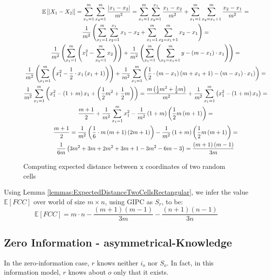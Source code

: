 \documentclass[letterpaper, 10 pt, conference]{ieeeconf}  %
\newcommand\rob{\ensuremath{r}\xspace}
\newcommand\opp{\ensuremath{o}\xspace}
\newcommand{\fcc}{\ensuremath{FCC}\xspace}
\DeclarePairedDelimiter\abs{\lvert}{\rvert}%
\begin{document}
\begin{figure*}[thb]
      \centering
      \begin{multline*}
\mathbb{E}\left[\abs*{X_1-X_2}\right] =
\sum_{x_1=1}^{m}\sum_{x_2=1}^{m}{\frac{\abs*{x_1-x_2}}{m^2}} = \sum_{x_1=1}^{m}\sum_{x_2=1}^{x_1}{\frac{x_1-x_2}{m^2}}+\sum_{x_1=1}^{m}\sum_{x_2=x_1+1}^{m}{\frac{x_2-x_1}{m^2}}=\\
\frac{1}{m^2}\left(\sum_{x_1=1}^{m}\sum_{x_2=1}^{x_1}{x_1-x_2}+\sum_{x_1=1}^{m}\sum_{x_2=x_1+1}^{m}{x_2-x_1}\right)=\\
\frac{1}{m^2}\left(\sum_{x_1=1}^{m}{\left(x_1^2-\sum_{x_2=1}^{m}{x_2}\right)}\right)+
\frac{1}{m^2}\left(\sum_{x_1=1}^{m}\left(\sum_{x_2=x_1+1}^{m}{y}-\left(m-x_1\right)\cdot x_1\right)\right)=\\
\frac{1}{m^2}\left(\sum_{x_1=1}^{m}{\left(x_1^2-\frac{1}{2}\cdot x_1\left(x_1+1\right)\right)}\right)+
\frac{1}{m^2}\sum_{x_1=1}^{m}\left(\frac{1}{2}\cdot \left(m-x_1\right)\left(m+x_1+1)-\left(m-x_1\right)\cdot x_1\right)\right)=\\
\frac{1}{m^2}\sum_{x_1=1}^{m}{\left(x_1^2-\left(1+m\right)x_1+\left(\frac{1}{2}m^2+\frac{1}{2}m\right)\right)}=
\frac{m\left(\frac{1}{2}m^2+\frac{1}{2}m\right)}{m^2}+\frac{1}{m^2}\sum_{x_1=1}^{m}{\left(x_1^2-\left(1+m\right)x_1\right)}=\\
\frac{m+1}{2}+\frac{1}{m^2}\sum_{x_1=1}^{m}{x_1^2}-\frac{1}{m^2}\left(1+m\right)\left(\frac{1}{2}m\left(m+1\right)\right)=\\
\frac{m+1}{2}=\frac{1}{m^2}\left(\frac{1}{6}\cdot m\left(m+1\right)\left(2m+1\right)\right)-
\frac{1}{m^2}\left(1+m\right)\left(\frac{1}{2}m\left(m+1\right)\right)=\\
\frac{1}{6m}\left(3m^2+3m+2m^2+3m+1-3m^2-6m-3\right)=\frac{\left(m+1\right)\left(m-1\right)}{3m}
\end{multline*}
\caption{Computing expected distance between x coordinates of two random cells}
\label{figures: proof expected fcc gipc}
 \end{figure*}

Using Lemma \ref{lemmas:ExpectedDistanceTwoCellsRectangular}, we infer the value $\mathbb{E}[\fcc]$ over world of size $m\times n$, using GIPC as $S_{\rob}$, to be:
\begin{dmath*}[compact]
\mathbb{E}\left[\fcc\right]=m\cdot n-\frac{\left(m+1\right)\left(m-1\right)}{3m}-\frac{\left(n+1\right)\left(n-1\right)}{3n}
\end{dmath*}

\subsection{Zero Information - asymmetrical-Knowledge}
In the zero-information case, \rob knows neither $i_\opp$ nor $S_\opp$. In fact, in this information model, \rob knows about \opp only that it exists.
\end{document}
